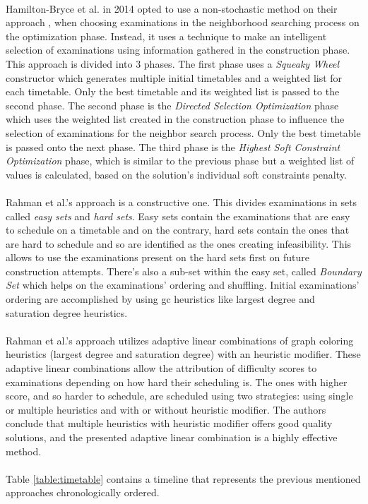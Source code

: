 \\
Hamilton-Bryce et al. \cite{Hamilton-Bryce2014} in 2014 opted to use a non-stochastic method on their approach \cite{Hamilton-Bryce2014}, when choosing examinations in the neighborhood searching process on the optimization phase. Instead, it uses a technique to make an intelligent selection of examinations using information gathered in the construction phase. This approach is divided into 3 phases. The first phase uses a \textit{Squeaky Wheel} constructor which generates multiple initial timetables and a weighted list for each timetable. Only the best timetable and its weighted list is passed to the second phase. The second phase is the \textit{Directed Selection Optimization} phase which uses the weighted list created in the construction phase to influence the selection of examinations for the neighbor search process. Only the best timetable is passed onto the next phase. The third phase is the \textit{Highest Soft Constraint Optimization} phase, which is similar to the previous phase but a weighted list of values is calculated, based on the solution's individual soft constraints penalty.\\
\\
Rahman et al.'s approach \cite{Rahman2014} is a constructive one. This divides examinations in sets called \textit{easy sets} and \textit{hard sets}. Easy sets contain the examinations that are easy to schedule on a timetable and on the contrary, hard sets contain the ones that are hard to schedule and so are identified as the ones creating infeasibility. This allows to use the examinations present on the hard sets first on future construction attempts. There's also a sub-set within the easy set, called \textit{Boundary Set} which helps on the examinations' ordering and shuffling. Initial examinations' ordering  are accomplished by using \gls{gc} heuristics like largest degree and saturation degree heuristics.\\
\\
Rahman et al.'s approach \cite{Rahman2014a} utilizes adaptive linear combinations of graph coloring heuristics (largest degree and saturation degree) with an heuristic modifier. These adaptive linear combinations allow the attribution of difficulty scores to examinations depending on how hard their scheduling is. The ones with higher score, and so harder to schedule, are scheduled using two strategies: using single or multiple heuristics and with or without heuristic modifier. The authors conclude that multiple heuristics with heuristic modifier offers good quality solutions, and the presented adaptive linear combination is a highly effective method.\\
\\
Table \ref{table:timetable} contains a timeline that represents the previous mentioned approaches chronologically ordered.


